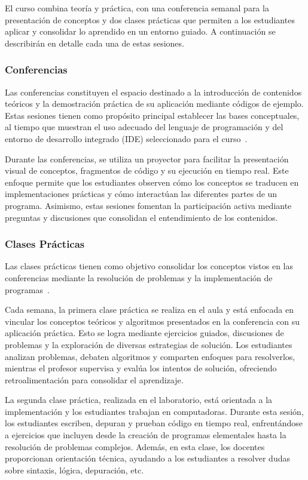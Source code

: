 \documentclass{article}
\begin{document}
El curso combina teoría y práctica, con una conferencia semanal para la presentación de conceptos y dos clases prácticas que permiten a los estudiantes aplicar y consolidar lo aprendido en un entorno guiado. A continuación se describirán en detalle cada una de estas sesiones.

\subsubsection{Conferencias}

Las conferencias constituyen el espacio destinado a la introducción de contenidos teóricos y la demostración práctica de su aplicación mediante códigos de ejemplo. Estas sesiones tienen como propósito principal establecer las bases conceptuales, al tiempo que muestran el uso adecuado del lenguaje de programación y del entorno de desarrollo integrado (IDE) seleccionado para el curso~\cite{plan_estudio_e_2017}.

Durante las conferencias, se utiliza un proyector para facilitar la presentación visual de conceptos, fragmentos de código y su ejecución en tiempo real. Este enfoque permite que los estudiantes observen cómo los conceptos se traducen en implementaciones prácticas y cómo interactúan las diferentes partes de un programa. Asimismo, estas sesiones fomentan la participación activa mediante preguntas y discusiones que consolidan el entendimiento de los contenidos.

\subsubsection{Clases Prácticas}
Las clases prácticas tienen como objetivo consolidar los conceptos vistos en las conferencias mediante la resolución de problemas y la implementación de programas~\cite{plan_estudio_e_2017}.

Cada semana, la primera clase práctica se realiza en el aula y está enfocada en vincular los conceptos teóricos y algoritmos presentados en la conferencia con su aplicación práctica. Esto se logra mediante ejercicios guiados, discusiones de problemas y la exploración de diversas estrategias de solución. Los estudiantes analizan problemas, debaten algoritmos y comparten enfoques para resolverlos, mientras el profesor supervisa y evalúa los intentos de solución, ofreciendo retroalimentación para consolidar el aprendizaje.

La segunda clase práctica, realizada en el laboratorio, está orientada a la implementación y los estudiantes trabajan en computadoras. Durante esta sesión, los estudiantes escriben, depuran y prueban código en tiempo real, enfrentándose a ejercicios que incluyen desde la creación de programas elementales hasta la resolución de problemas complejos. Además, en esta clase, los docentes proporcionan orientación técnica, ayudando a los estudiantes a resolver dudas sobre sintaxis, lógica, depuración, etc. 
\end{document}

